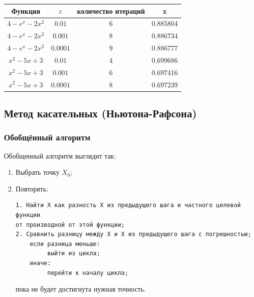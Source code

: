 \documentclass{article}
\begin{document}
			\begin{tabular}{|c|c|c|c|}
				\hline
				
				Функция & $\varepsilon$ & количество итераций & x\\
								
				\hline
				$4- e^x - 2x^2$ & $0.01$ & 6 & 0.885804\\
				
				\hline
				$4- e^x - 2x^2$ & $0.001$ & 8 & 0.886734\\
				\hline
				$4- e^x - 2x^2$ & $0.0001$ & 9 & 0.886777\\
				\hline
				
				
				
				$x^2 - 5x + 3$ & $0.01$ & 4 & 0.699686\\
				
				\hline
				$x^2 - 5x + 3$ & $0.001$ & 6 & 0.697416\\
				\hline
				$x^2 - 5x + 3$ & $0.0001$ & 8 & 0.697239
\\
				\hline
				
				
				\end{tabular}
				
			\subsection{Метод касательных (Ньютона-Рафсона)}
			
				\subsubsection{Обобщённый алгоритм}
				
							Обобщенный алгоритм выглядит так:
				
				\begin{enumerate}
					\item 
					
					Выбрать точку $X_0$;
					
					\item 
					
					Повторять:
					
					\begin{verbatim}
1. Найти X как разность X из предыдущего шага и частного целевой функции 
от производной от этой функции;
2. Сравнить разницу между Х и Х из предыдущего шага с погрешностью;
    если разница меньше:
         выйти из цикла;
    иначе: 
         перейти к началу цикла;
					\end{verbatim}
					пока не будет достигнута нужная точность.
				\end{enumerate}
				
\end{document}
